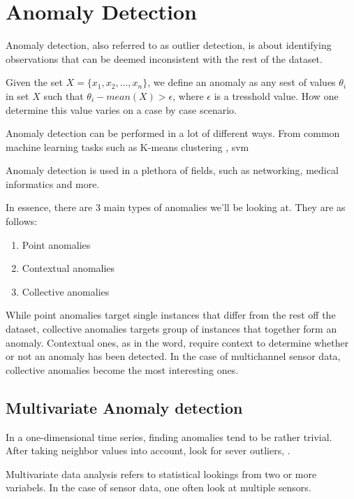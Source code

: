 \section{Anomaly Detection}

Anomaly detection, also referred to as outlier detection, is about identifying observations that can be deemed inconsistent with the rest of the dataset.  

Given the set $X = \{x_1, x_2, ..., x_n\}$, we define an anomaly as any sest of values $\theta_i$ in set $X$ such that $\theta_i - mean(X) > \epsilon$, where $\epsilon$ is a tresshold value. How one determine this value varies on a case by case scenario.

Anomaly detection can be performed in a lot of different ways. From common machine learning tasks such as K-means clustering \cite{7507933}, \Gls{svm} \cite{10.1007/978-3-540-28647-9_97}

Anomaly detection is used in a plethora of fields, such as networking, medical informatics and more. 

In essence, there are 3 main types of anomalies we'll be looking at. They are as follows:

\begin{enumerate}
    \item Point anomalies 
    \item Contextual anomalies 
    \item Collective anomalies
\end{enumerate}

While point anomalies target single instances that differ from the rest off the dataset, collective anomalies targets group of instances that together form an anomaly. Contextual ones, as in the word, require context to determine whether or not an anomaly has been detected. In the case of multichannel sensor data, collective anomalies become the most interesting ones. 


\subsection{Multivariate Anomaly detection}

In a one-dimensional time series, finding anomalies tend to be rather trivial. After taking neighbor values into account, look for sever outliers, .

Multivariate data analysis refers to statistical lookings from two or more variabels. In the case of sensor data, one often look at multiple sensors. 

